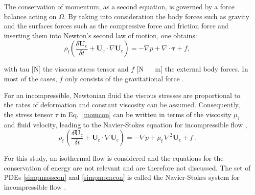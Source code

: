 The conservation of momentum, as a second equation, is governed by a force balance acting on $\Omega$.
By taking into consideration the body forces such as gravity and the surfaces forces such as the compressive force and friction force and inserting them into Newton's second law of motion, one obtains:
\begin{equation}
 \rho_\mathrm{f} \left( \frac{\delta \mathbf{U}_\mathrm{c}}{\delta t} + \mathbf{U}_\mathrm{c}\cdot \nabla \mathbf{U}_\mathrm{c} \right) = - \nabla p + \nabla \cdot \mathbf{\tau}  + f,
\label{momcon}
 \end{equation}

with \gls{tau} [\unit{\newton}] the viscous stress tensor and $f$ [\unit{\newton\,\reciprocal\metre}] the external body forces. In most of the cases, $f$ only consists of the gravitational force \citep{Versteeg1995,boekMS}. \par
For an incompressible, Newtonian fluid the viscous stresses are proportional to the rates of deformation and constant viscosity can be assumed. Consequently, the stress tensor $\tau$ in \mbox{Eq.\ \eqref{momcon}} can be written in terms of the viscosity $\mu_\mathrm{f}$ and fluid velocity, leading to the Navier-Stokes equation for incompressible flow \citep{Versteeg1995},
\begin{equation}
 \rho_\mathrm{f} \, \left( \frac{\delta \mathbf{U}_\mathrm{c}}{\delta t} + \mathbf{U}_\mathrm{c}\cdot \nabla \mathbf{U}_\mathrm{c} \right) = - \nabla p + \mu_\mathrm{f} \, \nabla^2 \mathbf{U}_\mathrm{c} + f \, .
\label{simpmomcon}
\end{equation}

For this study, an isothermal flow is considered and the equations for the conservation of energy are not relevant and are therefore not discussed. The set of \glspl{PDE} \eqref{simpmasscon} and \eqref{simpmomcon} is called the Navier-Stokes system for incompressible flow \citep{Versteeg1995}.

